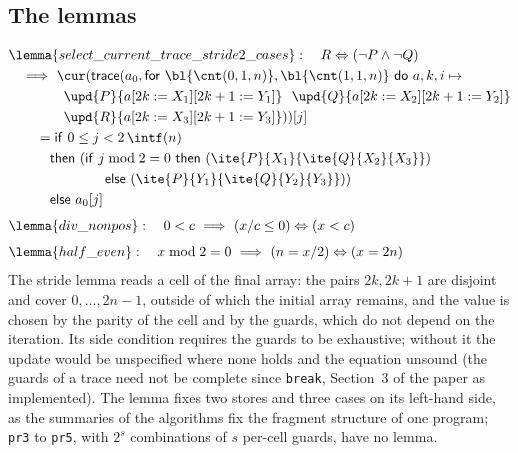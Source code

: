 \subsection{The lemmas}
\begin{align*}
  &\lemma{select\_current\_trace\_stride2\_cases}:\quad R \Leftrightarrow (\neg P \wedge \neg Q)\\
  &\quad\Longrightarrow\ \cur(\mathsf{trace}(a_0, \mathsf{for}\ \bl{\cnt(0, 1, n)}, \bl{\cnt(1, 1, n)}\ \mathsf{do}\ a, k, i \mapsto {}\\
  &\qquad\qquad \upd{P}{a[2k := X_1][2k + 1 := Y_1]}\ \ \upd{Q}{a[2k := X_2][2k + 1 := Y_2]}\\
  &\qquad\qquad \upd{R}{a[2k := X_3][2k + 1 := Y_3]}))[j]\\
  &\qquad = \mathsf{if}\ 0 \le j < 2\,\intf(n)\\
  &\qquad\quad \mathsf{then}\ (\mathsf{if}\ j \bmod 2 = 0\ \mathsf{then}\ (\ite{P}{X_1}{\ite{Q}{X_2}{X_3}})\\
  &\qquad\qquad\qquad\quad \mathsf{else}\ (\ite{P}{Y_1}{\ite{Q}{Y_2}{Y_3}}))\\
  &\qquad\quad \mathsf{else}\ a_0[j]\\[4pt]
  &\lemma{div\_nonpos}:\quad 0 < c\ \Longrightarrow\ (x / c \le 0) \Leftrightarrow (x < c)\\[4pt]
  &\lemma{half\_even}:\quad x \bmod 2 = 0\ \Longrightarrow\ (n = x / 2) \Leftrightarrow (x = 2n)
\end{align*}
The stride lemma reads a cell of the final array: the pairs $2k, 2k + 1$ are disjoint and cover
$0, \ldots, 2n - 1$, outside of which the initial array remains, and the value is chosen by the parity of
the cell and by the guards, which do not depend on the iteration. Its side condition requires the guards to
be exhaustive; without it the update would be unspecified where none holds and the equation unsound (the
guards of a trace need not be complete since \texttt{break}, Section~3 of the paper as implemented). The
lemma fixes two stores and three cases on its left-hand side, as the summaries of the algorithms fix the
fragment structure of one program; \texttt{pr3} to \texttt{pr5}, with $2^s$ combinations of $s$ per-cell
guards, have no lemma.

